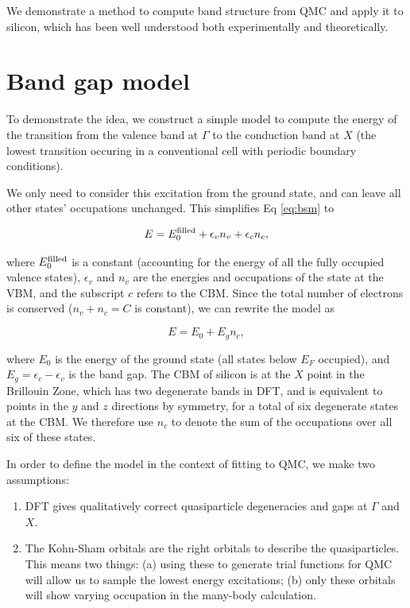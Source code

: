 We demonstrate a method to compute band structure from QMC and apply it to silicon, which has been well understood both experimentally and theoretically.

\section{Band gap model}

To demonstrate the idea, we construct a simple model to compute the energy of the transition from the valence band at $\Gamma$ to the conduction band at $X$ (the lowest transition occuring in a conventional cell with periodic boundary conditions).

We only need to consider this excitation from the ground state, and can leave all other states' occupations unchanged.
This simplifies Eq \ref{eq:bsm} to

\begin{equation}
E = E_0^{\rm filled} + \epsilon_v n_v + \epsilon_c n_c,
\end{equation}

where $E_0^{\rm filled}$ is a constant (accounting for the energy of all the fully occupied valence states), $\epsilon_v$ and $n_v$ are the energies and occupations of the state at the VBM, and the subscript $c$ refers to the CBM.
Since the total number of electrons is conserved ($n_v + n_c = C$ is constant), we can rewrite the model as

\begin{equation}\label{eq:bandgapmodel}
E = E_0 + E_g n_c,
\end{equation}

where $E_0$ is the energy of the ground state (all states below $E_F$ occupied), and $E_g = \epsilon_c - \epsilon_v$ is the band gap.
The CBM of silicon is at the $X$ point in the Brillouin Zone, which has two degenerate bands in DFT, and is equivalent to points in the $y$ and $z$ directions by symmetry, for a total of six degenerate states at the CBM.
We therefore use $n_c$ to denote the sum of the occupations over all six of these states.

In order to define the model in the context of fitting to QMC, we make two assumptions:

\begin{enumerate}
\item DFT gives qualitatively correct quasiparticle degeneracies and gaps at $\Gamma$ and $X$.
\item The Kohn-Sham orbitals are the right orbitals to describe the quasiparticles.
This means two things: 
(a) using these to generate trial functions for QMC will allow us to sample the lowest energy excitations; 
(b) only these orbitals will show varying occupation in the many-body calculation.
\end{enumerate}

